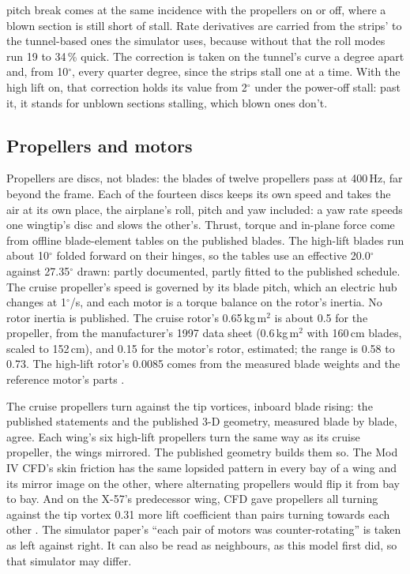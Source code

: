 \documentclass[10pt,a4paper,twocolumn]{article}
\begin{document}
pitch break comes at the same incidence with the propellers on or off, where a blown section is still short of stall. Rate derivatives are carried from the strips' to the tunnel-based ones the simulator uses,
because without that the roll modes run 19 to 34\,\% quick. The correction is taken on the tunnel's curve a degree apart and, from 10$^\circ$, every quarter degree, since the strips stall one at a time. With the high lift on, that correction holds its value from 2$^\circ$ under the power-off stall: past it, it stands for unblown sections stalling, which blown ones don't.

\subsection{Propellers and motors}
Propellers are discs, not blades: the blades of twelve propellers pass at 400\,Hz, far beyond the frame. Each of the fourteen discs keeps its own speed and takes the air at its own place, the airplane's roll, pitch and yaw included: a yaw rate speeds one wingtip's disc and slows the other's. Thrust, torque and in-plane force come from offline blade-element tables on the
published blades. The high-lift blades run about 10$^\circ$ folded forward on their hinges, so the tables use an effective 20.0$^\circ$ against 27.35$^\circ$ drawn: partly documented, partly fitted to the published schedule. The cruise propeller's speed is governed by its blade pitch, which an electric hub changes at 1$^\circ$/s, and each motor is a torque balance on the rotor's inertia. No rotor inertia is published. The cruise rotor's 0.65\,kg\,m$^2$ is about 0.5 for the propeller, from the manufacturer's 1997 data sheet (0.6\,kg\,m$^2$ with
160\,cm blades, scaled to 152\,cm), and 0.15 for the motor's rotor, estimated; the range is 0.58 to 0.73. The high-lift rotor's 0.0085 comes from the measured blade weights and the reference motor's parts \cite{hlm}.

The cruise propellers turn against the tip vortices, inboard blade rising: the published statements \cite{borer,dv} and the published 3-D geometry, measured blade by blade, agree. Each wing's six high-lift propellers turn the same way as its cruise propeller, the wings mirrored. The published geometry builds them so. The Mod IV CFD's skin friction \cite{dv} has the same lopsided pattern in every bay of a wing and its mirror image on the other, where alternating propellers would flip it from bay to bay. And on the X-57's predecessor wing, CFD gave propellers all turning against the tip vortex 0.31 more lift coefficient than pairs turning towards each other \cite{deere}. The simulator paper's ``each pair of motors was counter-rotating'' \cite{sim3} is taken as left against right. It can also be read as neighbours, as this model first did, so that simulator may differ.
\end{document}
